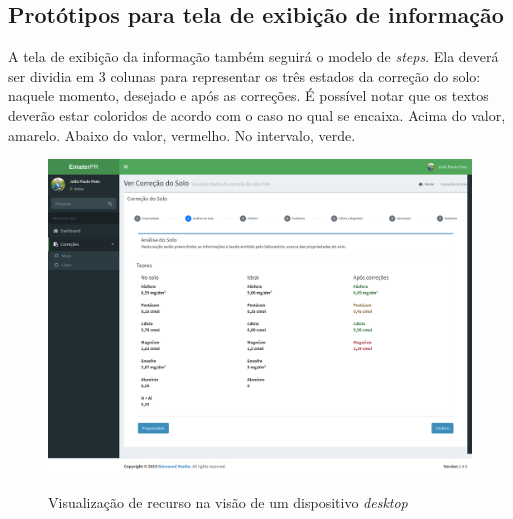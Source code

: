 \subsection{Protótipos para tela de exibição de informação}
\label{sec:titSecPrototiposShow}

A tela de exibição da informação também seguirá o modelo de \textit{steps}. Ela deverá ser dividia em 3 colunas para representar os três estados da correção do solo: naquele momento, desejado e após as correções. É possível notar que os textos deverão estar coloridos de acordo com o caso no qual se encaixa. Acima do valor, amarelo. Abaixo do valor, vermelho. No intervalo, verde.

\begin{figure}[H]
    \centering
    \caption{Visualização de recurso na visão de um dispositivo \textit{desktop}}
    \includegraphics[width=13cm]{./dados/figuras/prototipos/show_desktop.png}
    \label{fig:prototipo_show_desk}
\end{figure}

